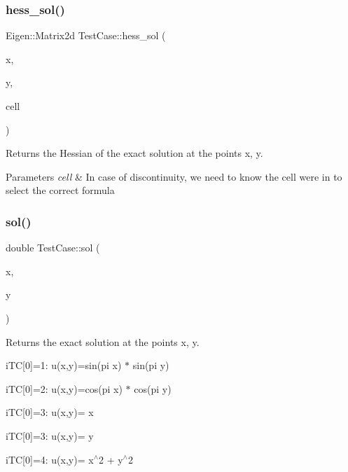 \subsubsection{\texorpdfstring{hess\+\_\+sol()}{hess\_sol()}}
{\footnotesize\ttfamily Eigen\+::\+Matrix2d Test\+Case\+::hess\+\_\+sol (\begin{DoxyParamCaption}\item[{const double}]{x,  }\item[{const double}]{y,  }\item[{const \hyperlink{classHArDCore2D_1_1Cell}{Cell} $\ast$}]{cell }\end{DoxyParamCaption})}



Returns the Hessian of the exact solution at the points x, y. 


\begin{DoxyParams}{Parameters}
{\em cell} & In case of discontinuity, we need to know the cell we\textquotesingle{}re in to select the correct formula \\
\hline
\end{DoxyParams}
\mbox{\label{classTestCase_aede719dac81c460c713d930a379c537e}} 
\subsubsection{\texorpdfstring{sol()}{sol()}}
{\footnotesize\ttfamily double Test\+Case\+::sol (\begin{DoxyParamCaption}\item[{const double}]{x,  }\item[{const double}]{y }\end{DoxyParamCaption})}



Returns the exact solution at the points x, y. 

i\+TC\mbox{[}0\mbox{]}=1\+: u(x,y)=sin(pi x) $\ast$ sin(pi y)

i\+TC\mbox{[}0\mbox{]}=2\+: u(x,y)=cos(pi x) $\ast$ cos(pi y)

i\+TC\mbox{[}0\mbox{]}=3\+: u(x,y)= x

i\+TC\mbox{[}0\mbox{]}=3\+: u(x,y)= y

i\+TC\mbox{[}0\mbox{]}=4\+: u(x,y)= x$^\wedge$2 + y$^\wedge$2 \mbox{\label{classTestCase_a5b2e54e9f17ac2ec9c1d675f97fbe335}} 
